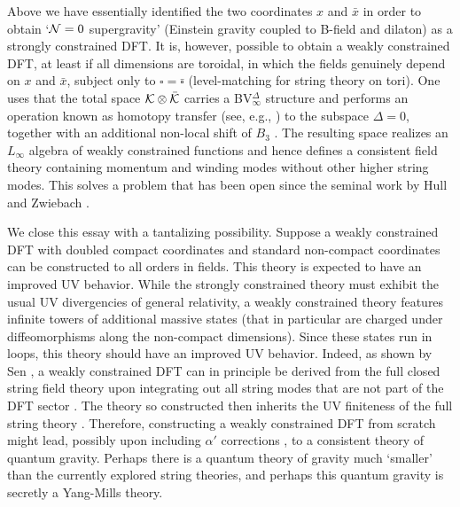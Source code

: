 \documentclass[12pt]{article}\pdfoutput=1
\def\B{\square}
\begin{document}
Above we have essentially  identified the two coordinates $x$ and $\bar{x}$ in order 
to obtain `${\cal N}=0$ supergravity' (Einstein gravity coupled to B-field and dilaton) 
as a  strongly constrained DFT. It is, however, possible to obtain a weakly constrained DFT, 
at least if all dimensions are toroidal, in which the fields genuinely depend on $x$ and $\bar{x}$, subject only 
to $\B=\bar{\B}$ (level-matching for  string theory on tori). 
One uses that the total  space ${\cal K}\otimes \bar{\cal K}$ carries a BV$_{\infty}^{\Delta}$  structure 
and performs an operation known as homotopy transfer (see, e.g., \cite{Vallette,Crainic,Arvanitakis:2020rrk,Arvanitakis:2021ecw}) 
to the subspace $\Delta=0$, together with an additional non-local shift of $B_3$ \cite{Bonezzitoappear}. 
The resulting space realizes an $L_{\infty}$ algebra of weakly constrained functions and hence defines a 
consistent field theory containing  momentum and winding modes without other higher string modes. 
This solves a 
problem that has been open since the seminal work by Hull and Zwiebach \cite{Hull:2009mi}. 



We close this essay with a tantalizing possibility. Suppose  a weakly constrained DFT with doubled compact coordinates 
and standard non-compact coordinates can be constructed to all orders in fields. This theory  
is expected to have an  
improved UV behavior.   
While the strongly constrained theory must exhibit the usual UV divergencies of 
general relativity, a weakly constrained theory features infinite towers of additional massive states 
(that in particular are charged under diffeomorphisms along the non-compact dimensions). Since these states 
run in loops, this theory should have an improved UV behavior.  
Indeed, as shown by Sen \cite{Sen:2016qap}, a weakly constrained DFT can in principle 
be derived from the full closed string field theory upon integrating out all string modes that are not part of 
the DFT sector \cite{Arvanitakis:2021ecw}. 
The theory so constructed then inherits the UV finiteness of the full string theory \cite{Sen:2016qap}. 
Therefore, constructing a weakly constrained DFT from scratch might lead, possibly upon including $\alpha'$ corrections \cite{Hohm:2013jaa,Hohm:2014xsa},  to a consistent theory of 
quantum gravity. 
Perhaps there is a quantum theory of gravity much `smaller' than the currently explored string theories, 
and perhaps this quantum gravity is  secretly a Yang-Mills theory. 
\end{document}
